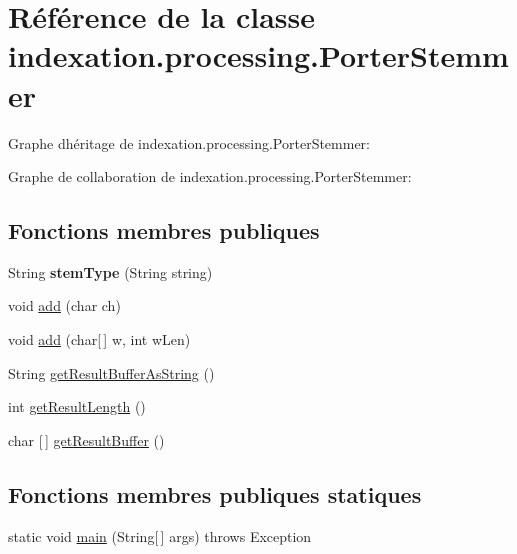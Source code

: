 \hypertarget{classindexation_1_1processing_1_1PorterStemmer}{}\section{Référence de la classe indexation.\+processing.\+Porter\+Stemmer}
\label{classindexation_1_1processing_1_1PorterStemmer}


Graphe d\textquotesingle{}héritage de indexation.\+processing.\+Porter\+Stemmer\+:


Graphe de collaboration de indexation.\+processing.\+Porter\+Stemmer\+:
\subsection*{Fonctions membres publiques}
\begin{DoxyCompactItemize}
\item 
\mbox{\label{classindexation_1_1processing_1_1PorterStemmer_ae05007f6966f59f250490c1f1da18ea7}} 
String {\bfseries stem\+Type} (String string)
\item 
void \hyperlink{classindexation_1_1processing_1_1PorterStemmer_a707458b373324b9949c3e81b1f35161f}{add} (char ch)
\item 
void \hyperlink{classindexation_1_1processing_1_1PorterStemmer_acbf12a93895c42d6387c3d33cbccdfe0}{add} (char\mbox{[}$\,$\mbox{]} w, int w\+Len)
\item 
String \hyperlink{classindexation_1_1processing_1_1PorterStemmer_a67d818639497e0dad6ced251e5562be8}{get\+Result\+Buffer\+As\+String} ()
\item 
int \hyperlink{classindexation_1_1processing_1_1PorterStemmer_a1009cbe95a2ba30b6665848e8b0d6208}{get\+Result\+Length} ()
\item 
char \mbox{[}$\,$\mbox{]} \hyperlink{classindexation_1_1processing_1_1PorterStemmer_a8a549225c6b843fb730000e2d291913c}{get\+Result\+Buffer} ()
\end{DoxyCompactItemize}
\subsection*{Fonctions membres publiques statiques}
\begin{DoxyCompactItemize}
\item 
static void \hyperlink{classindexation_1_1processing_1_1PorterStemmer_a893422ac6f517cc2e2f1f12f049918a4}{main} (String\mbox{[}$\,$\mbox{]} args)  throws Exception  	
\end{DoxyCompactItemize}


